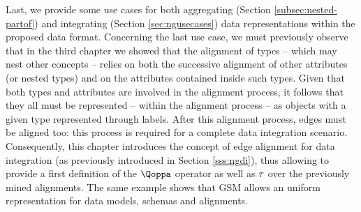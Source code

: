 Last, we provide some use cases for both aggregating (Section \ref{subsec:nested-partof}) and integrating (Section \ref{sec:ngusecases}) data representations within the proposed data format. Concerning the last use case, we must previously observe that in the third chapter we  showed that the alignment of types -- which may nest other concepts -- relies on both the successive alignment of other attributes (or nested types) and on the attributes contained inside such types. Given that both types and attributes are involved in the alignment process, it follows that they all must be represented -- within the alignment process -- as objects with a given type represented through labels. 
After this alignment process, edges must be aligned too: this process is required for a complete data integration scenario. Consequently, this chapter introduces the concept of edge alignment for data integration (as previously introduced in Section \vref{sss:ngdi}), thus allowing to provide a first definition of the $\qtransl$ operator as well as $\ttransl$ over the previously mined alignments. The same example shows that GSM allows an uniform representation for data models, schemas and alignments.

